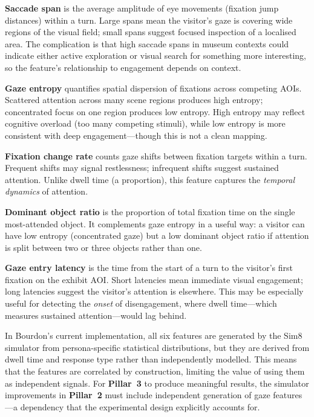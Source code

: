 \documentclass[a4paper, 11pt]{article}
\newcommand{\pillar}[1]{\textbf{Pillar~#1}}
\begin{document}
\textbf{Saccade span} is the average amplitude of eye movements (fixation jump distances) within a turn. Large spans mean the visitor's gaze is covering wide regions of the visual field; small spans suggest focused inspection of a localised area. The complication is that high saccade spans in museum contexts could indicate either active exploration or visual search for something more interesting, so the feature's relationship to engagement depends on context.

\textbf{Gaze entropy} quantifies spatial dispersion of fixations across competing AOIs. Scattered attention across many scene regions produces high entropy; concentrated focus on one region produces low entropy. High entropy may reflect cognitive overload (too many competing stimuli), while low entropy is more consistent with deep engagement---though this is not a clean mapping.

\textbf{Fixation change rate} counts gaze shifts between fixation targets within a turn. Frequent shifts may signal restlessness; infrequent shifts suggest sustained attention. Unlike dwell time (a proportion), this feature captures the \emph{temporal dynamics} of attention.

\textbf{Dominant object ratio} is the proportion of total fixation time on the single most-attended object. It complements gaze entropy in a useful way: a visitor can have low entropy (concentrated gaze) but a low dominant object ratio if attention is split between two or three objects rather than one.

\textbf{Gaze entry latency} is the time from the start of a turn to the visitor's first fixation on the exhibit AOI. Short latencies mean immediate visual engagement; long latencies suggest the visitor's attention is elsewhere. This may be especially useful for detecting the \emph{onset} of disengagement, where dwell time---which measures sustained attention---would lag behind.

In Bourdon's current implementation, all six features are generated by the Sim8 simulator from persona-specific statistical distributions, but they are derived from dwell time and response type rather than independently modelled. This means that the features are correlated by construction, limiting the value of using them as independent signals. For \pillar{3} to produce meaningful results, the simulator improvements in \pillar{2} must include independent generation of gaze features---a dependency that the experimental design explicitly accounts for.
\end{document}
